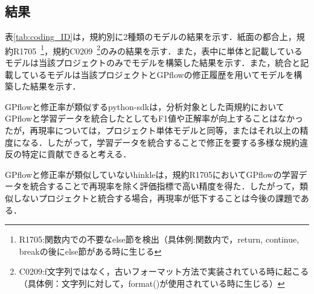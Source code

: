 \documentclass[uplatex,dvipdfmx,a4paper,twocolumn,base=10.5pt,jbase=10.5pt,ja=standard]{bxjsarticle}  %
\begin{document}
\vspace{2mm}
\subsection{結果}
\vspace{2mm}
表\ref{tab:coding_ID}は，規約別に2種類のモデルの結果を示す．紙面の都合上，規約R1705~\footnote{R1705:関数内での不要なelse節を検出（具体例:関数内で，return, continue, breakの後にelse節がある時に生じる}，規約C0209~\footnote{C0209:f文字列ではなく，古いフォーマット方法で実装されている時に起こる（具体例：文字列に対して，format()が使用されている時に生じる）}のみの結果を示す．また，表中に単体と記載しているモデルは当該プロジェクトのみでモデルを構築した結果を示す．また，統合と記載しているモデルは当該プロジェクトとGPflowの修正履歴を用いてモデルを構築した結果を示す．


GPflowと修正率が類似するpython-sdkは，分析対象とした両規約においてGPflowと学習データを統合したとしてもF1値や正解率が向上することはなかったが，再現率については，プロジェクト単体モデルと同等，またはそれ以上の精度になる．したがって，学習データを統合することで修正を要する多様な規約違反の特定に貢献できると考える．

GPflowと修正率が類似していないhinkleは，規約R1705においてGPflowの学習データを統合することで再現率を除く評価指標で高い精度を得た．したがって，類似しないプロジェクトと統合する場合，再現率が低下することは今後の課題である．


\end{document}
